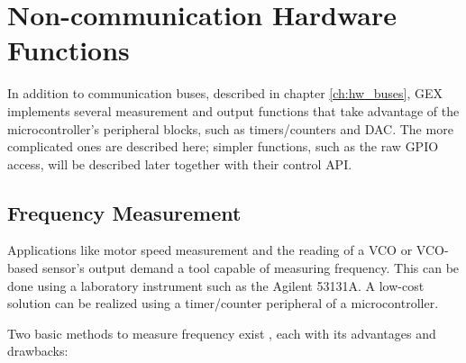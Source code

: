\chapter{Non-communication Hardware Functions}

In addition to communication buses, described in chapter \ref{ch:hw_buses}, GEX implements several measurement and output functions that take advantage of the microcontroller's peripheral blocks, such as timers/counters and \gls{DAC}. The more complicated ones are described here; simpler functions, such as the raw \gls{GPIO} access, will be described later together with their control \gls{API}.

\section{Frequency Measurement} \label{sec:theory-fcap}

Applications like motor speed measurement and the reading of a \gls{VCO} or \gls{VCO}-based sensor's output demand a tool capable of measuring frequency. This can be done using a laboratory instrument such as the Agilent 53131A. A low-cost solution can be realized using a timer/counter peripheral of a microcontroller.

\noindent
Two basic methods to measure frequency exist \cite{fcap-twotypes}, each with its advantages and drawbacks:

